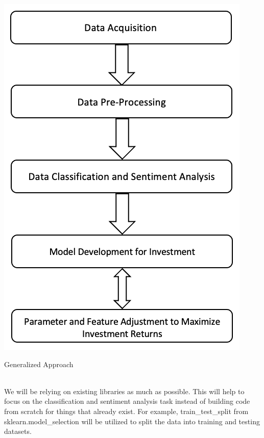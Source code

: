 \documentclass[twocolumn,12pt]{article}
\makeatletter
\newenvironment{figurehere}
  {\def\@captype{figure}}
  {}
\makeatother
\begin{document}
\begin{multicols}{2}
\begin{flushleft}
	\begin{figurehere}
		\centering
		\includegraphics[width=0.65\linewidth]{images/gen_approach.png}
		\caption{Generalized Approach}
		\label{fig:gen_approach}
	\end{figurehere}
	
	\mbox{}\\
	We will be relying on existing libraries as much as possible. This will help to focus on the classification and sentiment analysis task instead of building code from scratch for things that already exist. For example, train\_test\_split from sklearn.model\_selection \cite{scdatasplit} will be utilized to split the data into training and testing datasets.
		

\end{flushleft}
\end{multicols}
\end{document}
